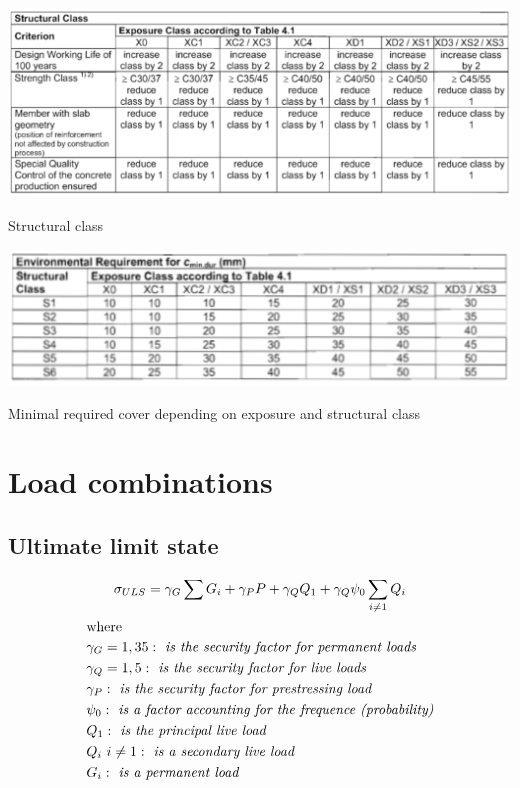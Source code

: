 \documentclass[landscape]{article}
\begin{document}
\begin{multicols*}{2}
\begin{table}[H]
    \centering
    \includegraphics[width=0.95\linewidth]{img/4_3.png}
    \caption{Structural class}
    \label{tab:struct_class}
\end{table}
\begin{table}[H]
    \centering
    \includegraphics[width=0.95\linewidth]{img/4_4.png}
    \caption{Minimal required cover depending on exposure and structural class}
    \label{tab:min_cover}
\end{table}


\section{Load combinations} %
\label{sec:load_combinations}
\subsection{Ultimate limit state} %
\label{sub:ultimate_limit_state}
\begin{gather}\label{eq:2.1}
      \sigma_{ULS} = \gamma_G \sum G_i + \gamma_P P + \gamma_Q Q_1+ \gamma_Q \psi_0\sum_{i\neq 1} Q_i  \\
      \shortintertext{where}
      \begin{aligned}
        &\gamma_G = 1,35: \emph{ is the security factor for permanent loads} \\
        &\gamma_Q = 1,5: \emph{ is the security factor for live loads} \\
        &\gamma_P: \emph{ is the security factor for prestressing load} \\
        &\psi_0 : \emph{ is a factor accounting for the frequence (probability)}\\
        &Q_1: \emph{ is the principal live load}\\
        &Q_i \ i \neq 1: \emph{ is a secondary live load} \\
        &G_i: \emph{ is a permanent load}
      \end{aligned}\notag
    \end{gather}

\end{multicols*}
\end{document}
